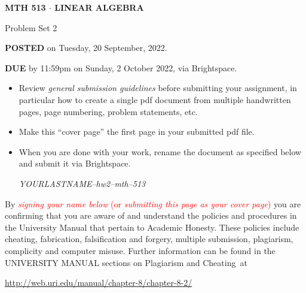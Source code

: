\documentclass[11pt,table]{article}
\newcommand{\<}				{\langle}
\renewcommand{\>}      		{\rangle}
\newcommand {\overbox}      {\end{tcolorbox}}
\newcommand {\basicbox} 		{\begin{tcolorbox}[width=\textwidth,colback={black!1}]}
\begin{document}
\thispagestyle{empty}

\begin{center}
	{\bf MTH 513  $\cdot$ LINEAR ALGEBRA}
	
	\medskip
	
	Problem Set 2
	
\end{center}

\basicbox
	
	\noindent
	{\bf POSTED} on Tuesday, 20 September, 2022. 
	
	\bigskip
	
	\noindent
	{\bf DUE} by 11:59pm on Sunday, 2 October 2022, via Brightspace.
	
	\bigskip
	



\begin{itemize}
	\item Review {\em general submission guidelines} before submitting your assignment, in particular how to create a single pdf document from multiple handwritten pages, page numbering, problem statements, etc. 
	
	\item Make this ``cover page'' the first page in your submitted pdf file. 
		
	\item When you are done with your work, rename the document as specified below and submit it via Brightspace. 
	
	\begin{center} 
		{\em YOURLASTNAME--hw2--mth--513} 
	\end{center} 
\end{itemize} 





\overbox


	\bigskip
	\bigskip
	
	\noindent 
	By \textcolor{red}{{\em signing your name below} (or {\em submitting this page as your cover page})}
	you are confirming that 
	you are aware of and understand
	the policies and procedures in the University Manual that pertain to Academic Honesty.
	These policies include cheating, fabrication, falsification and forgery, multiple submission,
	plagiarism, complicity and computer misuse. 
	Further information can be found in the UNIVERSITY MANUAL sections on Plagiarism and Cheating~at
	\begin{center}
		\url{http://web.uri.edu/manual/chapter-8/chapter-8-2/}
	\end{center}
\end{document}
